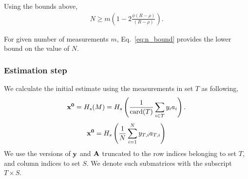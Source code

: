
Using the bounds above,
\begin{align}
N \geq m \left(1-2\frac{\phi(R-\rho)}{(R-\rho)} \right).
\label{eq:n_bound}
\end{align}
%

For given number of measurements $m$, Eq.~\ref{eq:n_bound} provides the lower bound on the value of $N$.
\subsubsection{Estimation step}
We calculate the initial estimate using the measurements in set $T$ as following,
$$
\mathbf{{x}^0} = H_s(M) = H_s\left(\frac{1}{\mathrm{card}(T)}\sum_{i\in T}y_{i}a_{i}\right).
$$
$$
\mathbf{x^0} = H_s\left( \frac{1}{N}\sum_{i=1}^{N}y_{T,i}a_{T,i}\right)
$$
We use the versions of $\mathbf{y}$ and $\mathbf{A}$ truncated to the row indices belonging to set $T$, and column indices to set $S$. We denote such submatrices with the subscript $T\times S$. 

